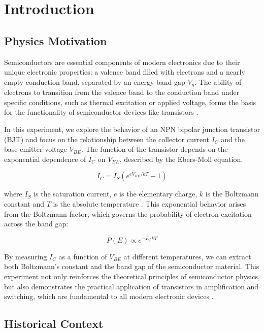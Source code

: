 \documentclass[12pt,letterpaper,onecolumn]{article}
\begin{document}

\section{Introduction}

\subsection{Physics Motivation}

Semiconductors are essential components of modern electronics due to their unique electronic properties: a valence band filled with electrons and a nearly empty conduction band, separated by an energy band gap \( V_g \). The ability of electrons to transition from the valence band to the conduction band under specific conditions, such as thermal excitation or applied voltage, forms the basis for the functionality of semiconductor devices like transistors \cite{Thornton}.

In this experiment, we explore the behavior of an NPN bipolar junction transistor (BJT) and focus on the relationship between the collector current \( I_C \) and the base emitter voltage \( V_{BE} \). The function of the transistor depends on the exponential dependence of \( I_C \) on \( V_{BE} \), described by the Ebers-Moll equation.

\[
I_C = I_S \left(e^{eV_{BE}/kT} - 1\right)
\]

where \( I_S \) is the saturation current, \( e \) is the elementary charge, \( k \) is the Boltzmann constant and \( T \) is the absolute temperature \cite{Neudeck}. This exponential behavior arises from the Boltzmann factor, which governs the probability of electron excitation across the band gap:

\[
P(E) \propto e^{-E/kT}
\]

By measuring \( I_C \) as a function of \( V_{BE} \) at different temperatures, we can extract both Boltzmann’s constant and the band gap of the semiconductor material. This experiment not only reinforces the theoretical principles of semiconductor physics, but also demonstrates the practical application of transistors in amplification and switching, which are fundamental to all modern electronic devices \cite{Thornton}.

\subsection{Historical Context}
\end{document}
